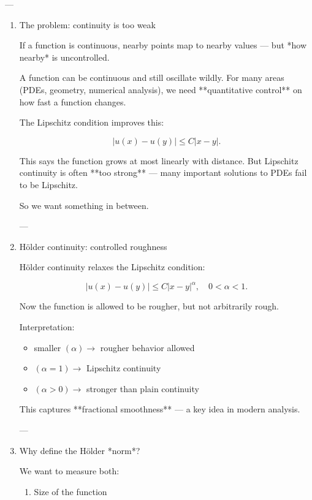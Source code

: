 \documentclass[12pt,a4paper]{report}
\begin{document}
\begin{description}
---

\begin{enumerate}

\item The problem: continuity is too weak

If a function is continuous, nearby points map to nearby values — but *how nearby* is uncontrolled.

A function can be continuous and still oscillate wildly. For many areas (PDEs, geometry, numerical analysis), we need **quantitative control** on how fast a function changes.

The Lipschitz condition improves this:

$$
|u(x)-u(y)| \le C|x-y|.
$$

This says the function grows at most linearly with distance. But Lipschitz continuity is often **too strong** — many important solutions to PDEs fail to be Lipschitz.

So we want something in between.

---

\item Hölder continuity: controlled roughness

Hölder continuity relaxes the Lipschitz condition:

$$
|u(x)-u(y)| \le C|x-y|^\alpha, \quad 0<\alpha<1.
$$

Now the function is allowed to be rougher, but not arbitrarily rough.

Interpretation:

\begin{itemize}

\item smaller $( \alpha ) \to $ rougher behavior allowed
\item $( \alpha=1 ) \to $ Lipschitz continuity
\item $( \alpha>0 ) \to $ stronger than plain continuity

\end{itemize}
This captures **fractional smoothness** — a key idea in modern analysis.

---

\item Why define the Hölder *norm*?

We want to measure both:

\begin{enumerate}

\item Size of the function


\end{enumerate}
\end{enumerate}
\end{description}
\end{document}

